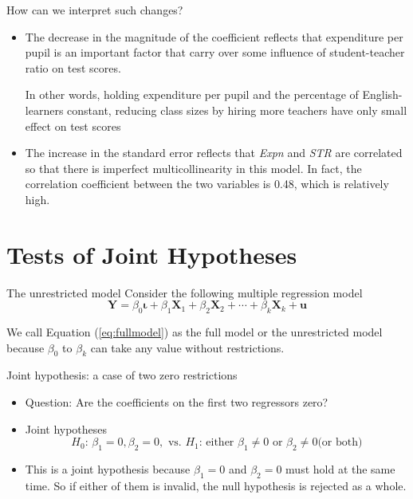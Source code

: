 \documentclass[presentation,10pt]{beamer}
\begin{document}
\begin{frame}[label={sec:orgc5360a5}]{How can we interpret such changes?}
\begin{itemize}
\item The decrease in the magnitude of the coefficient reflects that
expenditure per pupil is an important factor that carry over some
influence of student-teacher ratio on test scores.
\vspace{0.2cm}

In other words, holding expenditure per pupil and the percentage of
English-learners constant, reducing class sizes by hiring more
teachers have only small effect on test scores
\vspace{0.2cm}

\item The increase in the standard error reflects that \emph{Expn} and \emph{STR}
are correlated so that there is imperfect multicollinearity in this
model. In fact, the correlation coefficient between the two
variables is 0.48, which is relatively high.
\end{itemize}
\end{frame}

\section{Tests of Joint Hypotheses}
\label{sec:orgee2a40f}
\setcounter{tocdepth}{1}
\tableofcontents[currentsection]
\begin{frame}[label={sec:org4cff55a}]{The unrestricted model}
Consider the following multiple regression model
\begin{equation}
\label{eq:fullmodel}
\mathbf{Y} = \beta_0 \boldsymbol{\iota} + \beta_1 \mathbf{X}_1 + \beta_2 \mathbf{X}_2 + \cdots + \beta_k \mathbf{X}_k + \mathbf{u}
\end{equation}

We call Equation (\ref{eq:fullmodel}) as the full model or \alert{the
unrestricted model} because \(\beta_0\) to \(\beta_k\) can take any value
without restrictions.
\end{frame}

\begin{frame}[label={sec:orge5c6f97}]{Joint hypothesis: a case of two zero restrictions}
\begin{itemize}
\item Question: Are the coefficients on the first two regressors zero?

\item Joint hypotheses
\[ H_0:\, \beta_1 = 0, \beta_2 = 0, \text{ vs. }
  H_1:\, \text{either } \beta_1 \neq 0 \text{ or } \beta_2 \neq 0 \text{
  (or both)} \]

\item This is a joint hypothesis because \(\beta_1=0\) and \(\beta_2=0\) must
hold at the same time. So if either of them is invalid, the null
hypothesis is rejected as a whole.
\end{itemize}
\end{frame}
\end{document}

